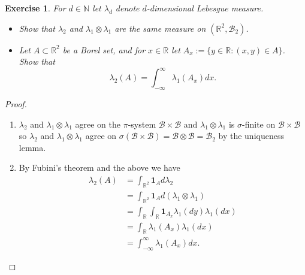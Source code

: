 \documentclass{article}
\newtheorem{exercise}[theorem]{Exercise}
\begin{document}
\begin{exercise}
For $d \in \mathbb{N}$ let $\lambda_d$ denote $d$-dimensional Lebesgue measure.
\begin{itemize}
    \item[(a)] Show that $\lambda_2$ and $\lambda_1 \otimes \lambda_1$ are the same measure on $(\mathbb{R}^2, \mathcal{B}_2)$.
    \item[(b)] Let $A \subset \mathbb{R}^2$ be a Borel set, and for $x \in \mathbb{R}$ let $A_x := \{y \in \mathbb{R} : (x, y) \in A\}$. Show that
    \[
    \lambda_2(A) = \int_{-\infty}^{\infty} \lambda_1(A_x)dx.
    \]
\end{itemize}
\end{exercise}
\begin{proof}
\begin{enumerate}
    \item[(a)] $\lambda_2$ and $\lambda_1\otimes\lambda_1$ agree on the $\pi$-system $\mathcal{B}\times\mathcal{B}$ and $\lambda_1\otimes\lambda_1$ is $\sigma$-finite on $\mathcal{B}\times\mathcal{B}$ so $\lambda_2$ and $\lambda_1\otimes\lambda_1$ agree on $\sigma(\mathcal{B}\times\mathcal{B})=\mathcal{B}\otimes\mathcal{B}=\mathcal{B}_2$ by the uniqueness lemma.
    \item[(b)] By Fubini's theorem and the above we have \begin{align*}\lambda_2(A)&=\int_{\mathbb{R}^2}\mathbf{1}_Ad\lambda_2\\&=\int_{\mathbb{R}^2}\mathbf{1}_Ad(\lambda_1\otimes\lambda_1)\\&=\int_\mathbb{R}\int_\mathbb{R}\mathbf{1}_{A_x}\lambda_1(dy)\lambda_1(dx)\\&=\int_\mathbb{R}\lambda_1(A_x)\lambda_1(dx)\\&=\int_{-\infty}^\infty\lambda_1(A_x)dx.\end{align*}
\end{enumerate}
\end{proof}
\end{document}
